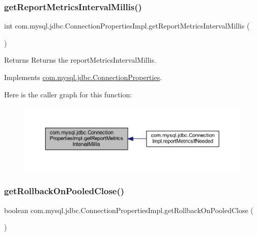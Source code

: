 \subsubsection{\texorpdfstring{get\+Report\+Metrics\+Interval\+Millis()}{getReportMetricsIntervalMillis()}}
{\footnotesize\ttfamily int com.\+mysql.\+jdbc.\+Connection\+Properties\+Impl.\+get\+Report\+Metrics\+Interval\+Millis (\begin{DoxyParamCaption}{ }\end{DoxyParamCaption})}

\begin{DoxyReturn}{Returns}
Returns the report\+Metrics\+Interval\+Millis. 
\end{DoxyReturn}


Implements \mbox{\hyperlink{interfacecom_1_1mysql_1_1jdbc_1_1_connection_properties_aac4f74c781305ad6b2eb71913e184de3}{com.\+mysql.\+jdbc.\+Connection\+Properties}}.

Here is the caller graph for this function\+:\nopagebreak
\begin{figure}[H]
\begin{center}
\leavevmode
\includegraphics[width=350pt]{classcom_1_1mysql_1_1jdbc_1_1_connection_properties_impl_a4edd40bce78479f65769de2f31a13efc_icgraph}
\end{center}
\end{figure}
\mbox{\label{classcom_1_1mysql_1_1jdbc_1_1_connection_properties_impl_a0fae8f273bff1dfd51555b3b130cef9a}} 
\subsubsection{\texorpdfstring{get\+Rollback\+On\+Pooled\+Close()}{getRollbackOnPooledClose()}}
{\footnotesize\ttfamily boolean com.\+mysql.\+jdbc.\+Connection\+Properties\+Impl.\+get\+Rollback\+On\+Pooled\+Close (\begin{DoxyParamCaption}{ }\end{DoxyParamCaption})}

